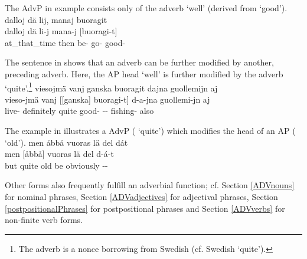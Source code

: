 The AdvP in example  consists only of the adverb  ‘well’ (derived from  ‘good’).
\ea\label{AdvPex1}
\glll	dalloj dä lij, manaj buoragit\\
	dalloj dä li-j mana-j {[buoragi-t]\subAdvP}\\
	at\_that\_time then be- go- good-\\\nopagebreak
{}	
\z

The sentence in  shows that an adverb can be further modified by another, preceding adverb. Here, the AP head  ‘well’ is further modified by the adverb  ‘quite’.\footnote{The adverb  is a nonce borrowing from Swedish (cf. Swedish  ‘quite’).}
\ea\label{derivedADVsEx2repeat}%
\glll	viesojmä vanj ganska buoragit dajna guollemijn aj\\
	vieso-jmä vanj {[[ganska]\subAdvP{}} {buoragi-t]\subAdvP{}} d-a-jna guollemi-jn aj\\
	live- definitely quite good- -- fishing- also\\\nopagebreak
{}	
\z

The example in  illustrates a AdvP ( ‘quite’) which modifies the head of an AP ( ‘old’).
\ea\label{AdvPex2}
\glll	men åbbå vuoras lä del dát\\
	men {[åbbå]\subAdvP} vuoras lä del d-á-t\\
	but quite old\BS{} be\BS{} obviously --\\\nopagebreak
{}	
\z

Other forms also frequently fulfill an adverbial function; cf. 
Section \ref{ADVnouns} for nominal phrases, 
Section \ref{ADVadjectives} for adjectival phrases, 
Section \ref{postpositionalPhrases} for postpositional phrases 
and Section \ref{ADVverbs} for non-finite verb forms. 


